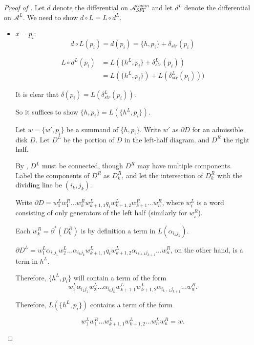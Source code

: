 \documentclass[a4paper,final, reqno]{amsart}
\theoremstyle{plain}
\theoremstyle{definition}
\newcommand{\A}{\mathcal{A}}
\begin{document}
	
	
	\begin{proof} [Proof of ]
		Let $d$ denote the differential on $\A^{comm}_{SFT}$ and let $d^L$ denote the differential on $\A^L$. We need to show $d \circ L = L \circ d^L$. 
		
		\begin{itemize}
			\item $x=p_i:$ 
			\[ d\circ L (p_i) = d(p_i) = \{h, p_i\} + \delta_{str}(p_i) \]
			
			\begin{align*}
				L\circ d^L(p_i) &=  L(\{h^L, p_i\} + \delta_{str}^L(p_i)) \\
				&= L(\{h^L, p_i\}) + L(\delta_{str}^L(p_i)))
			\end{align*}
			
			
			
			
			It is clear that $\delta(p_i) = L(\delta_{str}^L(p_i))$.
			
			So it suffices to show $\{h,p_i\} = L(\{h^L, p_i\})$.			
			
			
			Let $w=\{w', p_i\}$ be a summand of $\{h, p_i\}$. Write $w'$ as $\partial D$ for an admissible disk $D$. Let $D^L$ be the portion of $D$ in the left-half diagram, and $D^R$ the right half.
			
			By , $D^L$ must be connected, though $D^R$ may have multiple components. Label the components of $D^R$ as $D_k^R$, and let the intersection of $D_k^R$ with the dividing line be $(i_k,j_k)$.
			
			Write $\partial D = w_1^Lw_1^R\dots w_k^R w_{k+1, 1}^L q_i w_{k+1,2}^L w_{k+1}^R \dots w_n^R$, where $w_i^L$ is a word consisting of only generators of the left half (similarly for $w_i^R$). 
			
			Each $w_k^R = \partial^*(D_k^R)$ is by definition a term in $L(\alpha_{i_kj_k})$. 
			
			$\partial D^L = w_1^L \alpha_{i_1j_1}w_2^L\dots \alpha_{i_kj_k} w_{k+1,1}^L q_i w_{k+1,2}^L \alpha_{i_{k+1}j_{k+1}}\dots w_n^R$, on the other hand, is a term in $h^L$. 
			
			Therefore, $\{h^L, p_i\}$ will contain a term of the form 
			\[w_1^L \alpha_{i_1j_1}w_2^L\dots \alpha_{i_kj_k} w_{k+1,1}^Lw_{k+1,2}^L\alpha_{i_{k+1}j_{k+1}}\dots w_n^R. \]
			
			Therefore, $L(\{h^L, p_i\})$ contains a term of the form 
			
			\[ w_1^Lw_1^R \dots w_{k+1,1}^Lw_{k+1,2}^L \dots w_{n}^Lw_n^R = w. \]
			

\end{itemize}
\end{proof}
\end{document}
